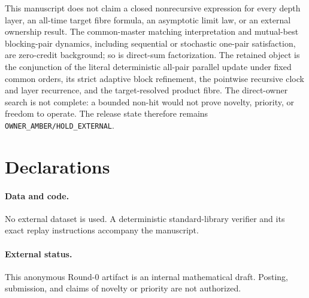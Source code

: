\documentclass[a4paper,10pt]{amsart}
\theoremstyle{definition}
\theoremstyle{remark}
\begin{document}
This manuscript does not claim a closed nonrecursive expression for every
depth layer, an all-time target fibre formula, an asymptotic limit law, or an
external ownership result.  The common-master matching interpretation and
mutual-best blocking-pair dynamics, including sequential or stochastic
one-pair satisfaction, are zero-credit background; so is direct-sum
factorization.  The retained object is the conjunction of the literal
deterministic all-pair parallel update under fixed common orders, its strict
adaptive block refinement, the pointwise recursive clock and layer
recurrence, and the target-resolved product fibre.  The direct-owner search
is not complete: a bounded non-hit would not prove novelty, priority, or
freedom to operate.
The release state therefore remains \texttt{OWNER\_AMBER/HOLD\_EXTERNAL}.

\section*{Declarations}

\paragraph{Data and code.} No external dataset is used.  A deterministic
standard-library verifier and its exact replay instructions accompany the
manuscript.

\paragraph{External status.} This anonymous Round-0 artifact is an internal
mathematical draft.  Posting, submission, and claims of novelty or priority
are not authorized.



\end{document}
